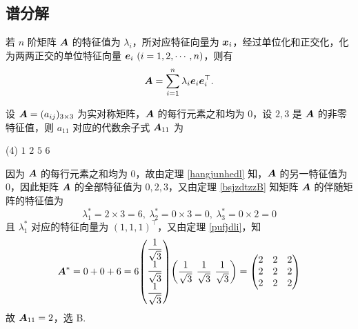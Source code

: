 \subsection{谱分解}

\begin{theorem}[谱分解定理]
    \label{pufjdli}若 $n$ 阶矩阵 $\vb*{A}$ 的特征值为 $\lambda_i$，所对应特征向量为 $\vb*{x}_i$，经过单位化和正交化，化为两两正交的单位特征向量 $\vb*{e}_i~ (i=1,2,\cdots,n)$，则有
    $$\vb*{A}=\sum_{i=1}^{n}\lambda_i\vb*{e}_i\vb*{e}_i^\top.$$
\end{theorem}

\begin{example}
    设 $\vb*{A}=(a_{ij})_{3\times3}$ 为实对称矩阵，$\vb*{A}$ 的每行元素之和均为 $0$，设 $2,3$ 是 $\vb*{A}$ 的非零特征值，则 $a_{11}$ 对应的代数余子式 $\vb*{A}_{11}$ 为
    \begin{tasks}(4)
        \task $1$
        \task $2$
        \task $5$
        \task $6$
    \end{tasks}
\end{example}
\begin{solution}
    因为 $\vb*{A}$ 的每行元素之和均为 $0$，故由定理 \ref{hangjunhedl} 知，$\vb*{A}$ 的另一特征值为 $0$，因此矩阵 $\vb*{A}$ 的全部特征值为 $0,2,3$，又由定理 \ref{bsjzdtzzB} 知矩阵 $\vb*{A}$ 的伴随矩阵的特征值为
    $$\lambda_1^*=2\times3=6,~\lambda_2^*=0\times 3=0,~\lambda_3^*=0\times 2=0$$
    且 $\lambda_1^*$ 对应的特征向量为 $(1,1,1)^\top$，又由定理 \ref{pufjdli}，知 $$\vb*{A}^*=0+0+6=6\mqty(\dfrac{1}{\sqrt{3}}\\[6pt]\dfrac{1}{\sqrt{3}}\\[6pt]\dfrac{1}{\sqrt{3}})\qty(\dfrac{1}{\sqrt{3}}~\dfrac{1}{\sqrt{3}}~\dfrac{1}{\sqrt{3}})=\mqty(2&2&2\\2&2&2\\2&2&2)$$
    故 $\vb*{A}_{11}=2$，选 B.
\end{solution}

